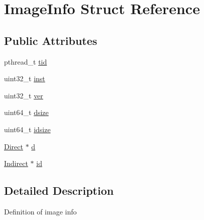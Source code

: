 \hypertarget{structImageInfo}{\section{\-Image\-Info \-Struct \-Reference}
\label{structImageInfo}
}
\subsection*{\-Public \-Attributes}
\begin{DoxyCompactItemize}
\item 
pthread\-\_\-t \hyperlink{structImageInfo_a58f9ca01e5ad860ad322d567aca091e8}{tid}
\item 
uint32\-\_\-t \hyperlink{structImageInfo_a5b94684351d07a24d15d50600dd10c40}{inst}
\item 
uint32\-\_\-t \hyperlink{structImageInfo_ac34e3b1b959eed46f2c3f882a7864abe}{ver}
\item 
uint64\-\_\-t \hyperlink{structImageInfo_ab66a6c455413448e3e6caf8364ea916f}{dsize}
\item 
uint64\-\_\-t \hyperlink{structImageInfo_ab79b5ded9de3743eca4eef16e926aca7}{idsize}
\item 
\hyperlink{structDirect}{\-Direct} $\ast$ \hyperlink{structImageInfo_a5c9bdef21d950704e2953f115b9ddd08}{d}
\item 
\hyperlink{structIndirect}{\-Indirect} $\ast$ \hyperlink{structImageInfo_a7093240a7ad1869f0338bfe10e088e10}{id}
\end{DoxyCompactItemize}


\subsection{\-Detailed \-Description}
\-Definition of image info 

